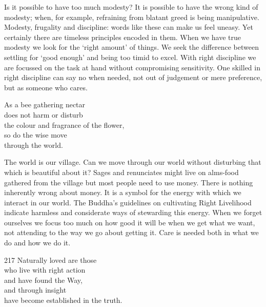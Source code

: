 \begin{dhpRefl}

Is it possible to have too much modesty? It is possible to have the
wrong kind of modesty; when, for example, refraining from blatant
greed is being manipulative. Modesty, frugality and discipline: words
like these can make us feel uneasy. Yet certainly there are timeless
principles encoded in them. When we have true modesty we look for the
`right amount' of things. We seek the difference between settling for
`good enough' and being too timid to excel. With right discipline we
are focussed on the task at hand without compromising sensitivity.
One skilled in right discipline can say no when needed, not out of
judgement or mere preference, but as someone who cares.

\end{dhpRefl}


\begin{dhpVerse}{49}
\label{dhp-49}
As a bee gathering nectar\\
does not harm or disturb\\
the colour and fragrance of the flower,\\
so do the wise move\\
through the world.
\end{dhpVerse}

\begin{dhpRefl}

The world is our village. Can we move through our world without
disturbing that which is beautiful about it? Sages and renunciates
might live on alms-food gathered from the village but most people
need to use money. There is nothing inherently wrong about money. It
is a symbol for the energy with which we interact in our world. The
Buddha's guidelines on cultivating Right Livelihood indicate harmless
and considerate ways of stewarding this energy. When we forget
ourselves we focus too much on how good it will be when we get what
we want, not attending to the way we go about getting it. Care is
needed both in what we do and how we do it.

\end{dhpRefl}


\begin{dhpVerse}{217}
\label{dhp-217}
Naturally loved are those\\
who live with right action\\
and have found the Way,\\
and through insight\\
have become established in the truth.
\end{dhpVerse}

